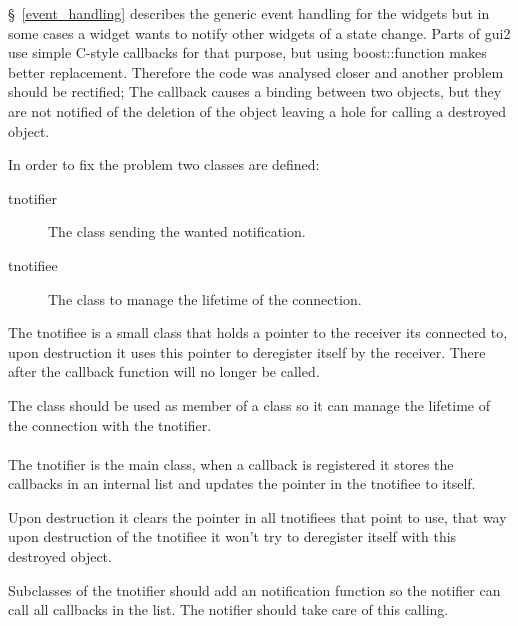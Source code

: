 \documentclass[a4paper,notitlepage,twocolumn,draft]{report}
\begin{document}
\S~\ref{event_handling} describes the generic event handling for the widgets but
in some cases a widget wants to notify other widgets of a state change. Parts of
gui2 use simple C-style callbacks for that purpose, but using boost::function
makes better replacement. Therefore the code was analysed closer and another
problem should be rectified; The callback causes a binding between two objects,
but they are not notified of the deletion of the object leaving a hole for
calling a destroyed object.

In order to fix the problem two classes are defined:

\begin{description}
\item[tnotifier] The class sending the wanted notification.
\item[tnotifiee] The class to manage the lifetime of the connection.
\end{description}

The tnotifiee is a small class that holds a pointer to the receiver its
connected to, upon destruction it uses this pointer to deregister itself by the
receiver. There after the callback function will no longer be called.

The class should be used as member of a class so it can manage the lifetime of
the connection with the tnotifier.

\paragraph{}

The tnotifier is the main class, when a callback is registered it stores the
callbacks in an internal list and updates the pointer in the tnotifiee to
itself.

Upon destruction it clears the pointer in all tnotifiees that point to use, that
way upon destruction of the tnotifiee it won't try to deregister itself with
this destroyed object.

Subclasses of the tnotifier should add an notification function so the notifier
can call all callbacks in the list. The notifier should take care of this
calling.
\end{document}
